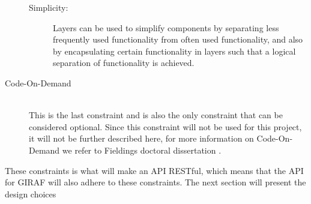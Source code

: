 \begin{description}
\begin{description}
        \item[Simplicity:] Layers can be used to simplify components by separating less frequently used functionality from often used functionality, and also by encapsulating certain functionality in layers such that a logical separation of functionality is achieved.
    \end{description}
    \item [Code-On-Demand] \hfill \\
    This is the last constraint and is also the only constraint that can be considered optional.
    Since this constraint will not be used for this project, it will not be further described here, for more information on Code-On-Demand we refer to Fieldings doctoral dissertation \citep{fielding2000rest}.
\end{description}

These constraints is what will make an API RESTful, which means that the API for GIRAF will also adhere to these constraints.
The next section will present the design choices
